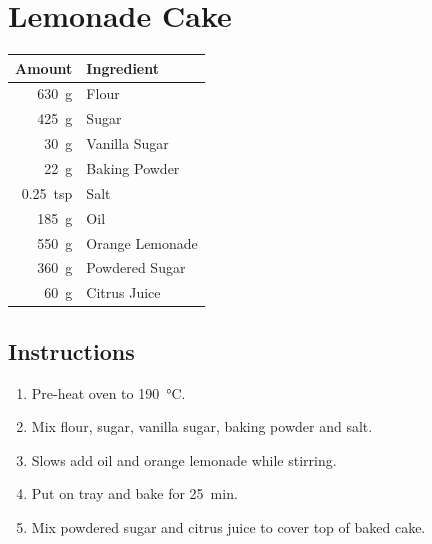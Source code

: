 \section*{Lemonade Cake}

\begin{tabular}{rl}
	\toprule
	Amount & Ingredient \\
	\midrule
	\qty{630}{g}    & Flour \\
	\qty{425}{g}    & Sugar \\
	\qty{30}{g}      & Vanilla Sugar \\
	\qty{22}{g}    & Baking Powder \\
	\qty{0.25}{tsp} & Salt \\
	\qty{185}{g}    & Oil \\
	\qty{550}{g}    & Orange Lemonade \\
	\midrule
	\qty{360}{g}    & Powdered Sugar \\
	\qty{60}{g}     & Citrus Juice \\
	\bottomrule
\end{tabular}

\subsection*{Instructions}
\begin{enumerate}
	\item Pre-heat oven to \qty{190}{\degreeCelsius}.
	\item Mix flour, sugar, vanilla sugar, baking powder and salt.
	\item Slows add oil and orange lemonade while stirring.
	\item Put on tray and bake for \qty{25}{min}.
	\item Mix powdered sugar and citrus juice to cover top of baked cake.
\end{enumerate}

